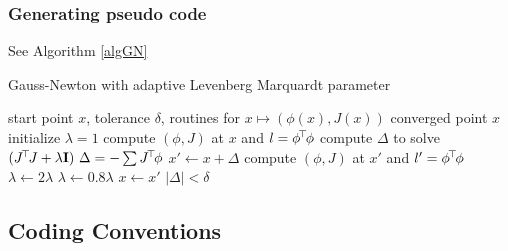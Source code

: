 \subsubsection{Generating pseudo code}

See Algorithm \ref{algGN}

\begin{algorithm}[ht]
\caption{Gauss-Newton with adaptive Levenberg Marquardt parameter}
\label{algGN}
\begin{algorithmic}[1]\small
\REQUIRE start point $x$, tolerance $\delta$, routines for $x \mapsto
  (\phi(x), J(x))$
\ENSURE converged point $x$
\STATE initialize $\lambda=1$
\STATE compute $(\phi, J)$ at $x$ and $l=\phi^{\!\top\!} \phi$
\REPEAT
\STATE\label{redo} compute $\Delta$ to solve $(J^{\!\top\!} J +\lambda {\rm\bf I})~ \Delta = - \sum
J^{\!\top\!} \phi$
\STATE $x' \gets x + \Delta$
\STATE compute $(\phi, J)$ at $x'$ and $l'=\phi^{\!\top\!} \phi$
\STATE $\lambda \gets 2\lambda$
\ELSE
\STATE $\lambda \gets 0.8\lambda$
\STATE $x \gets x'$
\ENDIF
\UNTIL $|\Delta| < \delta$
\end{algorithmic}
\end{algorithm}



\subsection{Coding Conventions}


